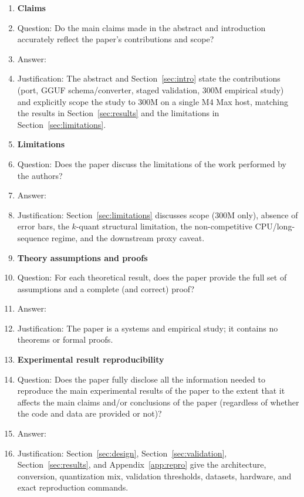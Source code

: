 \documentclass{article}
\begin{document}
\begin{enumerate}

\item {\bf Claims}
    \item[] Question: Do the main claims made in the abstract and introduction accurately reflect the paper's contributions and scope?
    \item[] Answer: \answerYes{}
    \item[] Justification: The abstract and Section~\ref{sec:intro} state the contributions (port, GGUF schema/converter, staged validation, 300M empirical study) and explicitly scope the study to 300M on a single M4 Max host, matching the results in Section~\ref{sec:results} and the limitations in Section~\ref{sec:limitations}.

\item {\bf Limitations}
    \item[] Question: Does the paper discuss the limitations of the work performed by the authors?
    \item[] Answer: \answerYes{}
    \item[] Justification: Section~\ref{sec:limitations} discusses scope (300M only), absence of error bars, the $k$-quant structural limitation, the non-competitive CPU/long-sequence regime, and the downstream proxy caveat.

\item {\bf Theory assumptions and proofs}
    \item[] Question: For each theoretical result, does the paper provide the full set of assumptions and a complete (and correct) proof?
    \item[] Answer: \answerNA{}
    \item[] Justification: The paper is a systems and empirical study; it contains no theorems or formal proofs.

    \item {\bf Experimental result reproducibility}
    \item[] Question: Does the paper fully disclose all the information needed to reproduce the main experimental results of the paper to the extent that it affects the main claims and/or conclusions of the paper (regardless of whether the code and data are provided or not)?
    \item[] Answer: \answerYes{}
    \item[] Justification: Section~\ref{sec:design}, Section~\ref{sec:validation}, Section~\ref{sec:results}, and Appendix~\ref{app:repro} give the architecture, conversion, quantization mix, validation thresholds, datasets, hardware, and exact reproduction commands.


\end{enumerate}
\end{document}
